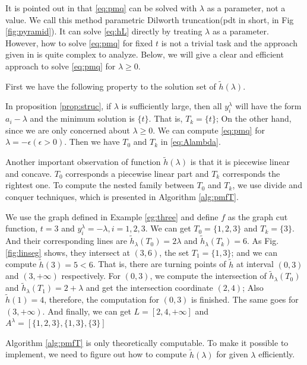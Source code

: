 \documentclass{article}
\begin{document}
It is pointed out in \cite{RN4} that \eqref{eq:pmq} can be solved with $\lambda$ as a parameter, not a value. We call this method parametric Dilworth truncation(pdt in short, in Fig \ref{fig:pyramid}). It can solve \eqref{eq:hL} directly by treating $\lambda$ as a parameter. However, how to solve \eqref{eq:pmq} for fixed $t$ is not a trivial task and the approach given in \cite{RN4} is quite complex to analyze. Below, we will give a clear and efficient approach to solve \eqref{eq:pmq} for $\lambda\geq 0$. 

First we have the following property to the solution set of $\tilde{h}(\lambda) $.


In proposition \ref{prop:struc}, if $\lambda$ is sufficiently large, then all $y_i^{\lambda}$ will have the form $a_i -  \lambda$ and the minimum solution is $\{t\}$. That is, $T_k = \{t\}$; On the other hand, since we are only concerned about $\lambda \geq 0$. We can compute \eqref{eq:pmq} for $\lambda = -\epsilon (\epsilon > 0)$. Then we have $T_0$ and $T_k$ in \eqref{eq:Alambda}.

Another important observation of function $\tilde{h}(\lambda)$ is that it is piecewise linear and concave. $T_0$ corresponds a piecewise linear part and $T_k$ corresponds the rightest one.  To compute the nested family between $T_0$ and $T_k$, we use divide and conquer techniques, which is presented in Algorithm \ref{alg:pmfT}.


\begin{example}
We use the graph defined in Example \ref{eg:three} and define $f$ as the graph cut function, $t=3$ and $y^{\lambda}_i = -\lambda, i=1,2,3$. 
We can get $T_0 = \{1,2,3\} $ and $T_k = \{3\}$. And their corresponding lines are $\tilde{h}_{\lambda}(T_0) =2\lambda$ and $\tilde{h}_{\lambda}(T_k)=6$. As Fig. \ref{fig:linseg} shows, they intersect at $(3, 6)$, the set $T_1=\{1,3\}$; and we can compute $\tilde{h}(3)=5<6$. That is, there are turning points of $\tilde{h}$ at interval $(0, 3)$ and $(3, +\infty)$ respectively. For $(0,3)$, we compute the intersection of $\tilde{h}_{\lambda}(T_0)$ and $\tilde{h}_{\lambda}(T_1)=2+\lambda$ and get the intersection coordinate $(2,4)$; Also $\tilde{h}(1)=4$, therefore, the computation for $(0,3)$ is finished. The same goes for $(3, +\infty)$. And finally, we can get $L=[2,4, +\infty]$ and $A^{\lambda} = [\{1,2,3\}, \{1,3\},\{3\}]$	
\end{example}

Algorithm \ref{alg:pmfT} is only theoretically computable. To make it possible to implement, we need to figure out how to compute $\tilde{h}(\lambda)$ for given $\lambda$ efficiently.
\end{document}

